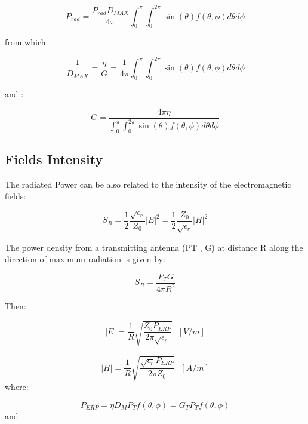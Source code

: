 \begin{equation}
	P_{rad} = \frac {P_{rad}D_{MAX}}{4 \pi}\int_0^{ \pi}\int_0^{2 \pi} \sin(\theta) f(\theta, \phi) d\theta d\phi
\end{equation}

from which:

\begin{equation}
	\frac{1}{D_{MAX}}=\frac{\eta}{G}= \frac{1}{4 \pi} \int_0^{\pi}\int_0^{2 \pi} \sin(\theta) f(\theta, \phi) d\theta d\phi
\end{equation}

and :

\begin{equation}
	G =\frac { 4\pi \eta}{\int_0^{ \pi}\int_0^{2 \pi} \sin(\theta) f(\theta, \phi) d\theta d\phi}
\end{equation}

\subsection{Fields Intensity} %
\label{sub:fields_intensity}

The radiated Power can be also related to the intensity of the electromagnetic fields:

\begin{equation}
	S_R=\frac{1}{2}\frac{\sqrt{\epsilon_r}}{Z_0}|E|^2= \frac{1}{2}\frac{Z_0}{\sqrt{\epsilon_r}}|H|^2
\end{equation}

The power density from a transmitting antenna (PT , G)
at distance R along the direction of maximum radiation
is given by: 

\begin{equation}	
S_R= \frac{P_TG}{4 \pi R^2}
\end{equation}


Then:

\begin{equation}
	|E| = \frac{1}{R} \sqrt{\frac{Z_0 P_{ERP}}{2\pi \sqrt{\epsilon_r}}} \ \ \ [V/m]
\end{equation}


\begin{equation}
	|H| = \frac{1}{R} \sqrt{\frac{\sqrt{\epsilon_r} P_{ERP}}{2\pi Z_0}} \ \ \ [A/m]
\end{equation}
where:

\begin{equation}
	P_{ERP}= \eta D_M P_T f(\theta , \phi) = G_T P_T f(\theta , \phi)
\end{equation}
and 

